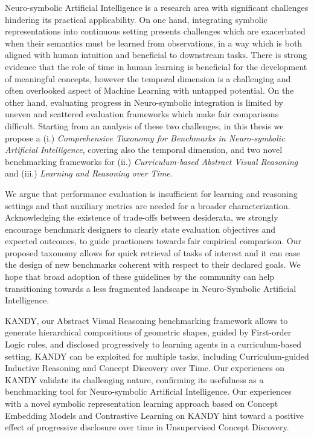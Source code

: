 Neuro-symbolic Artificial Intelligence is a research area with significant challenges hindering its practical applicability. On one hand, integrating symbolic representations into continuous setting presents challenges which are exacerbated when their semantics must be learned from observations, in a way which is both aligned with human intuition and beneficial to downstream tasks. There is strong evidence that the role of time in human learning is beneficial for the development of meaningful concepts, however the temporal dimension is a challenging and often overlooked aspect of Machine Learning with untapped potential.
%
On the other hand, evaluating progress in Neuro-symbolic integration is limited by uneven and scattered evaluation frameworks which make fair comparisons difficult.
%
Starting from an analysis of these two challenges, in this thesis we propose a (i.) \textit{Comprehensive Taxonomy for Benchmarks in Neuro-symbolic Artificial Intelligence}, covering also the temporal dimension, and two novel benchmarking frameworks for (ii.) \textit{Curriculum-based Abstract Visual Reasoning} and (iii.) \textit{Learning and Reasoning over Time}.

We argue that performance evaluation is insufficient for learning and reasoning settings and that auxiliary metrics are needed for a broader characterization. Acknowledging the existence of trade-offs between desiderata, we strongly encourage benchmark designers to clearly state evaluation objectives and expected outcomes, to guide practioners towards fair empirical comparison.
Our proposed taxonomy allows for quick retrieval of tasks of interest and it can ease the design of new benchmarks coherent with respect to their declared goals.
We hope that broad adoption of these guidelines by the community can help transitioning towards a less fragmented landscape in Neuro-Symbolic Artificial Intelligence.

\textsc{KANDY}, our Abstract Visual Reasoning benchmarking framework allows to generate hierarchical compositions of geometric shapes, guided by First-order Logic rules, and disclosed progressively to learning agents in a curriculum-based setting. \textsc{KANDY} can be exploited for multiple tasks, including Curriculum-guided Inductive Reasoning and Concept Discovery over Time. Our experiences on \textsc{KANDY} validate its challenging nature, confirming its usefulness as a benchmarking tool for Neuro-symbolic Artificial Intelligence. Our experiences with a novel symbolic representation learning approach based on Concept Embedding Models and Contrastive Learning on \textsc{KANDY} hint toward a positive effect of progressive disclosure over time in Unsupervised Concept Discovery.

